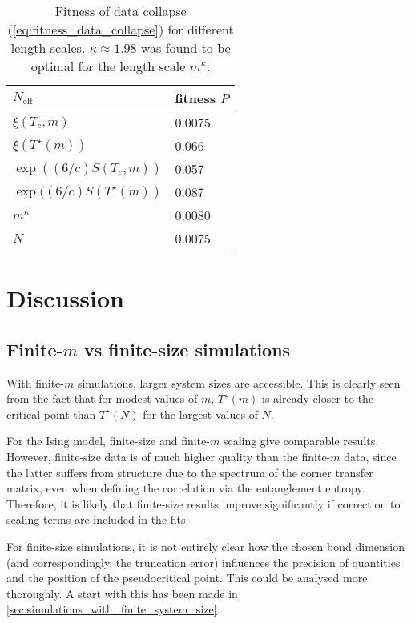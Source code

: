 \begin{table}[]
\centering
\begin{tabular}{@{}ll@{}} \toprule
$N_{\text{eff}}$                  & fitness $P$ \\ \midrule
$\xi(T_c, m)$                     & 0.0075      \\
$\xi(T^{\star}(m))$               & 0.066       \\
$\exp((6/c)S(T_c, m))$            & 0.057       \\
$\exp((6/c)S(T^{\star}(m))$       & 0.087       \\
$m^{\kappa}$                      & 0.0080      \\
$N$                               & 0.0075      \\ \bottomrule
\end{tabular}
  \caption{Fitness of data collapse (\autoref{eq:fitness_data_collapse}) for different length scales.
  $\kappa \approx 1.98$ was found to be optimal for the length scale $m^{\kappa}$.}
  \label{table:fitness_data_collapse_different_length_scales}
\end{table}


\section{Discussion}

\subsection{Finite-$m$ vs finite-size simulations}\label{sec:finite_m_vs_finite_N}

With finite-$m$ simulations, larger system sizes are accessible.
This is clearly seen from the fact that for modest values of $m$,
$T^{\star}(m)$ is already closer to the critical point than $T^{\star}(N)$ for the largest values of $N$.

For the Ising model, finite-size and finite-$m$ scaling give comparable results.
However, finite-size data is of much higher quality than the finite-$m$ data,
since the latter suffers from structure due to the spectrum of the corner transfer matrix,
even when defining the correlation via the entanglement entropy.
Therefore, it is likely that finite-size results improve significantly if correction to scaling terms are
included in the fits.

For finite-size simulations, it is not entirely clear how the chosen bond dimension (and correspondingly,
the truncation error) influences the precision of quantities and the position of the pseudocritical point.
This could be analysed more thoroughly.
A start with this has been made in \autoref{sec:simulations_with_finite_system_size}.

